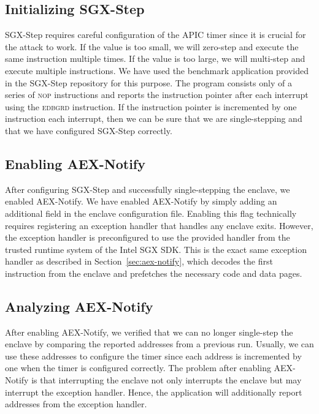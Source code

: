 \documentclass{llncs}
\begin{document}
\subsection{Initializing SGX-Step}


SGX-Step requires careful configuration of the APIC timer
since it is crucial for the attack to work.
If the value is too small, we will zero-step and execute the same instruction multiple times.
If the value is too large, we will multi-step and execute multiple instructions.
We have used the benchmark application provided in the SGX-Step repository for this purpose.
The program consists only of a series of \textsc{nop} instructions and
reports the instruction pointer after each interrupt using the \textsc{edbgrd} instruction.
If the instruction pointer is incremented by one instruction each interrupt,
then we can be sure that we are single-stepping and
that we have configured SGX-Step correctly.


\subsection{Enabling AEX-Notify}

After configuring SGX-Step and successfully single-stepping the enclave, we
enabled AEX-Notify.
We have enabled AEX-Notify by simply adding an additional field in the enclave
configuration file.
Enabling this flag technically requires registering an exception handler that
handles any enclave exits.
However, the exception handler is preconfigured to use the provided handler
from the trusted runtime system of the Intel SGX SDK.
This is the exact same exception handler as described in
Section~\ref{sec:aex-notify}, which decodes the first instruction from the
enclave and prefetches the necessary code and data pages.

\subsection{Analyzing AEX-Notify}

After enabling AEX-Notify, we verified that we can no longer single-step the
enclave by comparing the reported addresses from a previous run.
Usually, we can use these addresses to configure the timer since each address
is incremented by one when the timer is configured correctly.
The problem after enabling AEX-Notify is that interrupting the enclave not only
interrupts the enclave but may interrupt the exception handler.
Hence, the application will additionally report addresses from the exception
handler.
\end{document}
